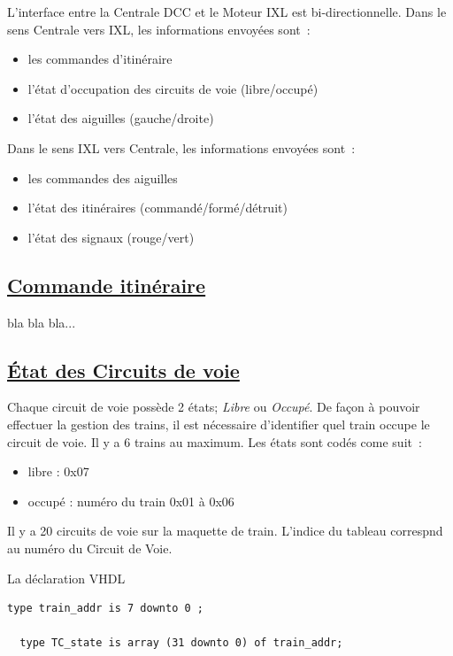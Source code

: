 L'interface entre la Centrale DCC et le Moteur IXL est bi-directionnelle. 
Dans le sens Centrale vers IXL, les informations envoyées sont~:
\begin{itemize}
\item les commandes d'itinéraire
\item l'état d'occupation des circuits de voie (libre/occupé)
\item l'état des aiguilles (gauche/droite)
\end{itemize}

Dans le sens IXL vers Centrale, les informations envoyées sont~:
\begin{itemize}
\item les commandes des aiguilles
\item l'état des itinéraires (commandé/formé/détruit)
\item l'état des signaux (rouge/vert)
\end{itemize}

\subsection{\underline{Commande itinéraire}}
\label{sec:ixl_iti}

bla bla bla...

\subsection{\underline{\'Etat des Circuits de voie}}
\label{sec:ixl_cdv}

Chaque circuit de voie possède 2 états; \emph{Libre} ou
\emph{Occupé}. De façon à pouvoir effectuer la gestion des trains, il
est nécessaire d'identifier quel train occupe le circuit de voie.
Il y a 6 trains au maximum. Les états sont codés come suit~:
\begin{itemize}
  \item libre : 0x07
  \item occupé : numéro du train 0x01 à 0x06
\end{itemize}  

Il y a 20 circuits de voie sur la maquette de train. L'indice du tableau correspnd au numéro du Circuit de Voie.

\medskip
La déclaration VHDL
\begin{lstlisting}[style=vhdl]
  type train_addr is 7 downto 0 ;

  type TC_state is array (31 downto 0) of train_addr;
\end{lstlisting}


